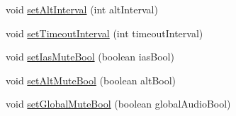 \begin{DoxyCompactItemize}
\item 
void \hyperlink{classpt_1_1lsts_1_1asa_1_1feedback_1_1CallOut_a986e5b2fadd0d00a3393f6403f4240d4}{set\+Alt\+Interval} (int alt\+Interval)
\item 
void \hyperlink{classpt_1_1lsts_1_1asa_1_1feedback_1_1CallOut_a68ff1ecaf96f74ee8339dc8eebea8c00}{set\+Timeout\+Interval} (int timeout\+Interval)
\item 
void \hyperlink{classpt_1_1lsts_1_1asa_1_1feedback_1_1CallOut_a111b426eb6d9a13e175eb81de0396b06}{set\+Ias\+Mute\+Bool} (boolean ias\+Bool)
\item 
void \hyperlink{classpt_1_1lsts_1_1asa_1_1feedback_1_1CallOut_a6aa729395af39b94620523c229fff8b1}{set\+Alt\+Mute\+Bool} (boolean alt\+Bool)
\item 
void \hyperlink{classpt_1_1lsts_1_1asa_1_1feedback_1_1CallOut_aee0344dbbf460658fce3e9b43c0bd604}{set\+Global\+Mute\+Bool} (boolean global\+Audio\+Bool)
\end{DoxyCompactItemize}
